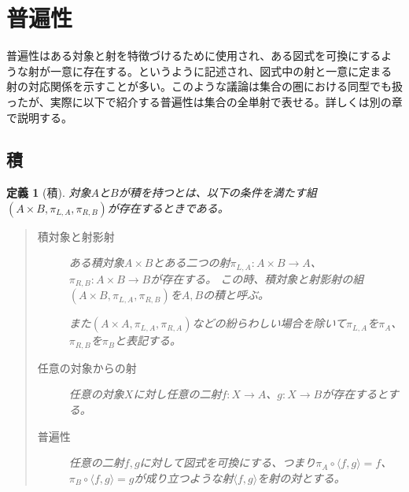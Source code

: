 \documentclass[dvipdfmx]{jsarticle}
\newcommand{\arrow}{\rightarrow}
\newcommand{\tuple}[1]{\langle #1\rangle}
\newcommand{\mor}[3]{#1:#2\arrow #3}
\newtheorem{define}{定義}[section]
\numberwithin{proof}{subsection}
\numberwithin{prop}{subsection}
\numberwithin{define}{subsection}
\begin{document}
	\section{普遍性}
	普遍性はある対象と射を特徴づけるために使用され、ある図式を可換にするような射が一意に存在する。というように記述され、図式中の射と一意に定まる射の対応関係を示すことが多い。このような議論は集合の圏における同型でも扱ったが、実際に以下で紹介する普遍性は集合の全単射で表せる。詳しくは別の章で説明する。
	\subsection{積}
	\begin{define}[積]
		対象$A$と$B$が積を持つとは、以下の条件を満たす組$(A\times B,\pi_{L,A},\pi_{R,B})$が存在するときである。
		\begin{quote}
			\begin{description}
			\item[積対象と射影射]ある積対象$A\times B$とある二つの射$\mor{\pi_{L,A}}{A\times B}{A}$、$\mor{\pi_{R,B}}{A\times B}{B}$が存在する。
			この時、積対象と射影射の組$(A\times B,\pi_{L,A},\pi_{R,B})$を$A,B$の積と呼ぶ。


			\begin{center}
			\end{center}
			また$(A\times A,\pi_{L,A},\pi_{R,A})$などの紛らわしい場合を除いて$\pi_{L,A}$を$\pi_A$、$\pi_{R,B}$を$\pi_B$と表記する。
			\item[任意の対象からの射]任意の対象$X$に対し任意の二射$\mor{f}{X}{A}$、$\mor{g}{X}{B}$が存在するとする。
			\begin{center}
			\end{center}
			\item[普遍性]任意の二射$f,g$に対して図式を可換にする、つまり$\pi_A\circ\tuple{f,g}=f$、$\pi_B\circ\tuple{f,g}=g$が成り立つような射$\tuple{f,g}$を射の対とする。


\end{description}
\end{quote}
\end{define}
\end{document}
